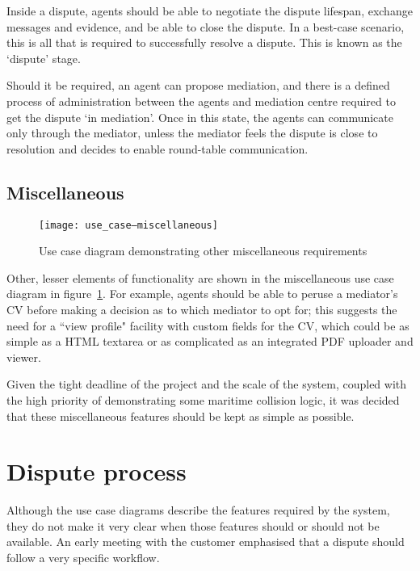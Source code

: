 Inside a dispute, agents should be able to negotiate the dispute lifespan, exchange messages and evidence, and be able to close the dispute. In a best-case scenario, this is all that is required to successfully resolve a dispute. This is known as the `dispute' stage.

Should it be required, an agent can propose mediation, and there is a defined process of administration between the agents and mediation centre required to get the dispute `in mediation'. Once in this state, the agents can communicate only through the mediator, unless the mediator feels the dispute is close to resolution and decides to enable round-table communication.

\subsection{Miscellaneous}

\begin{figure}[h!]
  \centering
    \ifimages
    \texttt{[image: use\_case--miscellaneous]}
    \fi
  \caption{Use case diagram demonstrating other miscellaneous requirements}
  \label{uml:useCase:miscellaneous}
\end{figure}

Other, lesser elements of functionality are shown in the miscellaneous use case diagram in figure~\ref{uml:useCase:miscellaneous}. For example, agents should be able to peruse a mediator's CV before making a decision as to which mediator to opt for; this suggests the need for a ``view profile" facility with custom fields for the CV, which could be as simple as a HTML textarea or as complicated as an integrated PDF uploader and viewer.

Given the tight deadline of the project and the scale of the system, coupled with the high priority of demonstrating some maritime collision logic, it was decided that these miscellaneous features should be kept as simple as possible.

\section{Dispute process}

Although the use case diagrams describe the features required by the system, they do not make it very clear when those features should or should not be available. An early meeting with the customer emphasised that a dispute should follow a very specific workflow.

